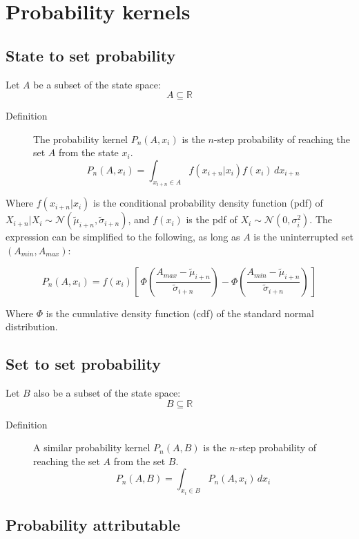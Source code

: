 \documentclass[letterpaper,10pt]{article} %
\begin{document}
\section{Probability kernels}

\subsection{State to set probability}
Let $A$ be a subset of the state space: 
%
$$A \subseteq \mathbb{R}$$

\begin{description}
\item [Definition] The probability kernel $P_n(A, x_i)$ is the $n$-step probability of reaching the set $A$ from the state $x_i$.
$$P_n(A, x_i) = \int_{x_{i+n}\in A}^{} f(x_{i+n}|x_i)f(x_i) \, dx_{i+n}$$
\end{description}

Where $f(x_{i+n}|x_i)$ is the conditional probability density function (pdf) of $X_{i+n}|X_i \sim \mathcal{N}( \tilde{\mu}_{i+n}, \tilde{\sigma}_{i+n})$, and $f(x_i)$ is the pdf of $X_i \sim \mathcal{N}(0, \sigma_i^2)$.
The expression can be simplified to the following, as long as $A$ is the uninterrupted set $(A_{min}, A_{max})$:

$$P_n(A, x_i) = f(x_i)[\, \Phi(\frac{A_{max}- \tilde{\mu}_{i+n}}{\tilde{\sigma}_{i+n}}) - \Phi(\frac{A_{min}- \tilde{\mu}_{i+n}}{\tilde{\sigma}_{i+n}}) \, ]$$

Where $\Phi$ is the cumulative density function (cdf) of the standard normal distribution. 


\subsection{Set to set probability}
Let $B$ also be a subset of the state space:
%
$$B \subseteq \mathbb{R}$$

\begin{description}
\item [Definition] A similar probability kernel $P_n(A, B)$ is the $n$-step probability of reaching the set $A$ from the set $B$. 
$$P_n(A, B) = \int_{x_i\in B}^{} P_n(A, x_i) \, dx_i$$
\end{description}




\subsection{Probability attributable}
\end{document}
